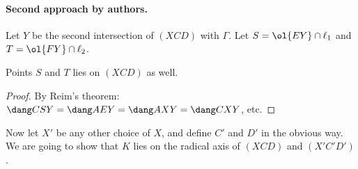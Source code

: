 \documentclass[11pt]{scrartcl}
\begin{document}
\paragraph{Second approach by authors.}
Let $Y$ be the second intersection of $(XCD)$ with $\Gamma$.
Let $S = \ol{EY} \cap \ell_1$ and $T = \ol{FY} \cap \ell_2$.
\begin{claim*}
  Points $S$ and $T$ lies on $(XCD)$ as well.
\end{claim*}
\begin{proof}
  By Reim's theorem: $\dang CSY = \dang AEY = \dang AXY = \dang CXY$, etc.
\end{proof}

Now let $X'$ be any other choice of $X$,
and define $C'$ and $D'$ in the obvious way.
We are going to show that $K$ lies on the radical axis
of $(XCD)$ and $(X'C'D')$.
\end{document}
